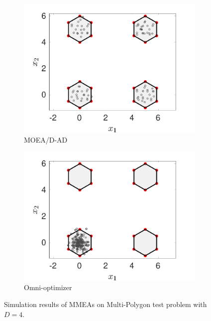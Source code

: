 \documentclass[conference]{IEEEtran}
\begin{document}
\begin{figure}[htbp]
    \begin{subfigure}[b]{.22\textwidth}
    \includegraphics[width=\linewidth]{Section5/dim4/PS/MOEADAD}
    \caption{MOEA/D-AD}
    \end{subfigure}
    \begin{subfigure}[b]{.22\textwidth}
    \includegraphics[width=\linewidth]{Section5/dim4/PS/OmniOptimizer}
    \caption{Omni-optimizer}
    \end{subfigure}
    \caption{Simulation results of MMEAs on Multi-Polygon test problem with $D=4$.}
    \label{fig: MMEAs PS dim=4}
\end{figure}
\end{document}
